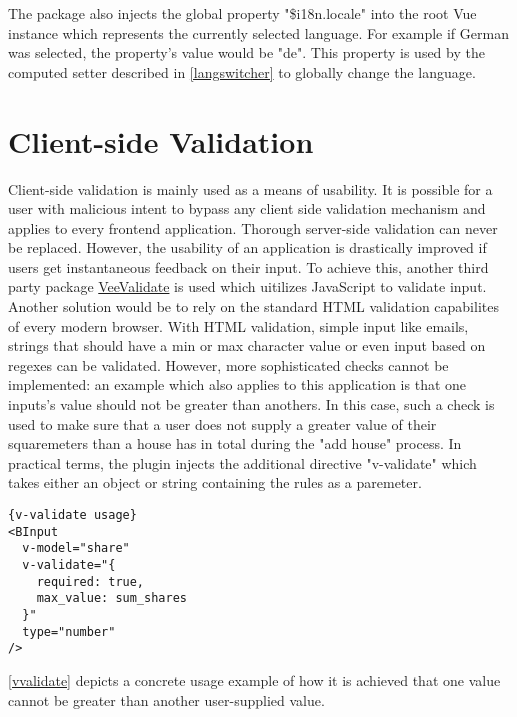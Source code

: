 The package also injects the global property "\$i18n.locale" into the root Vue instance which represents the currently selected language. For example if German was selected, the property's value would be "de". This property is used by the computed setter described in \autoref{langswitcher} to globally change the language.

\section{Client-side Validation}
Client-side validation is mainly used as a means of usability. It is possible for a user with malicious intent to bypass any client side validation mechanism and applies to every frontend application. Thorough server-side validation can never be replaced. However, the usability of an application is drastically improved if users get instantaneous feedback on their input. To achieve this, another third party package \href{https://baianat.github.io/vee-validate/}{VeeValidate} is used which uitilizes JavaScript to validate input. Another solution would be to rely on the standard HTML validation capabilites of every modern browser. With HTML validation, simple input like emails, strings that should have a min or max character value or even input based on regexes can be validated. However, more sophisticated checks cannot be implemented: an example which also applies to this application is that one inputs's value should not be greater than anothers. In this case, such a check is used to make sure that a user does not supply a greater value of their squaremeters than a house has in total during the "add house" process. In practical terms, the plugin injects the additional directive "v-validate" which takes either an object or string containing the rules as a paremeter. \newline


\begin{lstlisting}[caption=v-validate usage, captionpos=b, style=htmlcssjs, label=vvalidate]{v-validate usage}
<BInput
  v-model="share"
  v-validate="{
    required: true,
    max_value: sum_shares
  }"
  type="number"
/>
\end{lstlisting}


\autoref{vvalidate} depicts a concrete usage example of how it is achieved that one value cannot be greater than another user-supplied value. 

